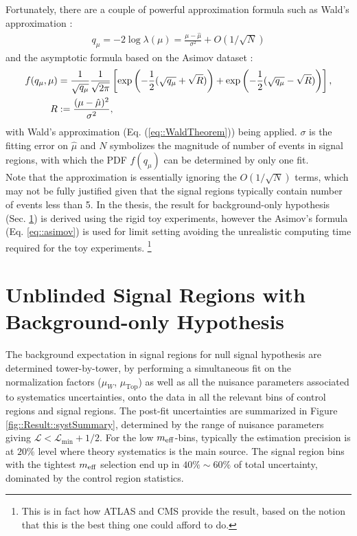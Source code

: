 Fortunately, there are a couple of powerful approximation formula such as Wald's approximation \cite{WaldTheorem}:
\begin{align}
q_\mu = -2 \log\lambda(\mu) = \frac{\mu-\hat{\mu}}{\sigma^2} + O(1/\sqrt{N}) \label{eq::WaldTheorem}
\end{align}
and the asymptotic formula based on the Asimov dataset \cite{AsymptoticAsimov}:
\begin{align}
f(q_\mu,\mu) & = \frac{1}{\sqrt{q_\mu}} \frac{1}{\sqrt{2\pi}} \left[ \exp \left( -\frac{1}{2}(\sqrt{q_\mu}+\sqrt{R}) \right) + \exp \left( -\frac{1}{2}(\sqrt{q_\mu}-\sqrt{R}) \right) \right], \nonumber \\
R & := \frac{(\mu-\hat{\mu})^2}{\sigma^2},
\label{eq::asimov}
\end{align}
with Wald's approximation (Eq. (\ref{eq::WaldTheorem})) being applied.  $\sigma$ is the fitting error on $\hat{\mu}$ and $N$ symbolizes the magnitude of number of events in signal regions, with which the PDF $f(q_\mu)$ can be determined by only one fit. \\

Note that the approximation is essentially ignoring the $O(1/\sqrt{N})$ terms,
which may not be fully justified given that the signal regions typically contain number of events less than 5.
In the thesis, the result for background-only hypothesis (Sec. \ref{sed::Result::bgOnly}) is derived using the rigid toy experiments, 
however the Asimov's formula (Eq. \ref{eq::asimov}) is used for limit setting avoiding the unrealistic computing time required for the toy experiments. 
\footnote{This is in fact how ATLAS and CMS provide the result, based on the notion that this is the best thing one could afford to do.}


\section{Unblinded Signal Regions with Background-only Hypothesis} \label{sed::Result::bgOnly}
The background expectation in signal regions for null signal hypothesis are determined tower-by-tower, 
by performing a simultaneous fit on the normalization factors ($\mu_W$, $\mu_{\mathrm{Top}}$) as well as all the nuisance parameters associated to systematics uncertainties, 
onto the data in all the relevant bins of control regions and signal regions.
The post-fit uncertainties are summarized in Figure \ref{fig::Result::systSummary}, determined by the range of nuisance parameters giving $\mathcal{L}<\mathcal{L}_{\mathrm{min}}+1/2$.
For the low $m_{\mathrm{eff}}$-bins, typically the estimation precision is at $20\%$ level where theory systematics is the main source.
The signal region bins with the tightest $m_{\mathrm{eff}}$ selection end up in $40\% \sim 60\%$ of total uncertainty, dominated by the control region statistics. \\

